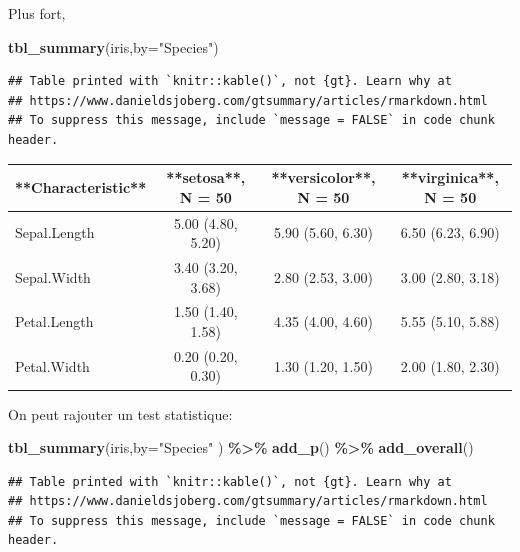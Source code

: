 \documentclass[
]{book}
\newenvironment{Shaded}{\begin{snugshade}}{\end{snugshade}}
\newcommand{\AttributeTok}[1]{\textcolor[rgb]{0.13,0.29,0.53}{#1}}
\newcommand{\FunctionTok}[1]{\textcolor[rgb]{0.13,0.29,0.53}{\textbf{#1}}}
\newcommand{\NormalTok}[1]{#1}
\newcommand{\SpecialCharTok}[1]{\textcolor[rgb]{0.81,0.36,0.00}{\textbf{#1}}}
\newcommand{\StringTok}[1]{\textcolor[rgb]{0.31,0.60,0.02}{#1}}
\begin{document}
Plus fort,

\begin{Shaded}
\begin{Highlighting}[]
\FunctionTok{tbl\_summary}\NormalTok{(iris,}\AttributeTok{by=}\StringTok{"Species"}\NormalTok{)}
\end{Highlighting}
\end{Shaded}

\begin{verbatim}
## Table printed with `knitr::kable()`, not {gt}. Learn why at
## https://www.danieldsjoberg.com/gtsummary/articles/rmarkdown.html
## To suppress this message, include `message = FALSE` in code chunk header.
\end{verbatim}

\begin{tabular}{l|c|c|c}
\hline
**Characteristic** & **setosa**, N = 50 & **versicolor**, N = 50 & **virginica**, N = 50\\
\hline
Sepal.Length & 5.00 (4.80, 5.20) & 5.90 (5.60, 6.30) & 6.50 (6.23, 6.90)\\
\hline
Sepal.Width & 3.40 (3.20, 3.68) & 2.80 (2.53, 3.00) & 3.00 (2.80, 3.18)\\
\hline
Petal.Length & 1.50 (1.40, 1.58) & 4.35 (4.00, 4.60) & 5.55 (5.10, 5.88)\\
\hline
Petal.Width & 0.20 (0.20, 0.30) & 1.30 (1.20, 1.50) & 2.00 (1.80, 2.30)\\
\hline
\end{tabular}

On peut rajouter un test statistique:

\begin{Shaded}
\begin{Highlighting}[]
\FunctionTok{tbl\_summary}\NormalTok{(iris,}\AttributeTok{by=}\StringTok{"Species"}\NormalTok{ ) }\SpecialCharTok{\%\textgreater{}\%} \FunctionTok{add\_p}\NormalTok{() }\SpecialCharTok{\%\textgreater{}\%} \FunctionTok{add\_overall}\NormalTok{()}
\end{Highlighting}
\end{Shaded}

\begin{verbatim}
## Table printed with `knitr::kable()`, not {gt}. Learn why at
## https://www.danieldsjoberg.com/gtsummary/articles/rmarkdown.html
## To suppress this message, include `message = FALSE` in code chunk header.
\end{verbatim}
\end{document}
